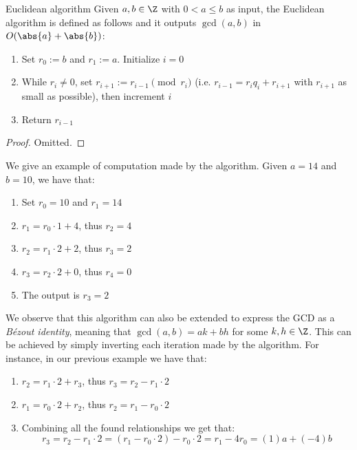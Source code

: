 \documentclass[a4paper, 12pt]{report}
\begin{document}
    \begin{framedalgo}{Euclidean algorithm}
        Given $a,b \in \Z$ with $0 < a \leq b$ as input, the Euclidean algorithm is defined as follows and it outputs $\gcd(a,b)$ in $O(\abs{a}+\abs{b})$:
        \begin{enumerate}
            \item Set $r_0 := b$ and $r_1 := a$. Initialize $i = 0$
            \item While $r_i \neq 0$, set $r_{i+1} := r_{i-1} \pmod{r_i}$ (i.e. $r_{i-1} = r_iq_i + r_{i+1}$ with $r_{i+1}$ as small as possible), then increment $i$
            \item Return $r_{i-1}$
        \end{enumerate} 
    \end{framedalgo}

    \begin{proof}
        Omitted.
    \end{proof}

    We give an example of computation made by the algorithm. Given $a = 14$ and $b = 10$, we have that:
    \begin{enumerate}
        \item Set $r_0 = 10$ and $r_1 = 14$
        \item $r_1 = r_0 \cdot 1 + 4$, thus $r_2 = 4$
        \item $r_2 = r_1 \cdot 2 + 2$, thus $r_3 = 2$
        \item $r_3 = r_2 \cdot 2 + 0$, thus $r_4 = 0$
        \item The output is $r_3 = 2$
    \end{enumerate}
    
    We observe that this algorithm can also be extended to express the GCD as a \textit{Bézout identity}, meaning that $\gcd(a,b) = ak+bh$ for some $k,h \in \Z$. This can be achieved by simply inverting each iteration made by the algorithm. For instance, in our previous example we have that:
    \begin{enumerate}
        \item $r_2 = r_1 \cdot 2 + r_3$, thus $r_3 = r_2 - r_1 \cdot 2$
        \item $r_1 = r_0 \cdot 2 + r_2$, thus $r_2 = r_1 - r_0 \cdot 2$
        \item Combining all the found relationships we get that:
        \[r_3 = r_2 - r_1 \cdot 2 = (r_1 - r_0 \cdot 2) - r_0 \cdot 2 = r_1 - 4r_0 = (1) a + (-4) b\]
    \end{enumerate}
\end{document}

